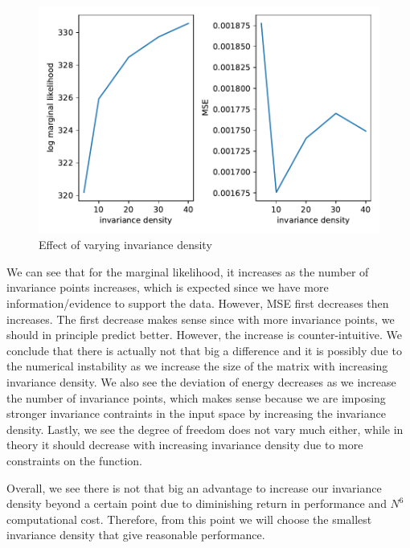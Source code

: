 \documentclass{statsmsc}
\begin{document}
\begin{figure}[H] 
  \includegraphics[width=0.8\linewidth]{../codes/figures/vary_invariance.pdf}
  \centering
  \caption{Effect of varying invariance density}
  \label{fig:vary_invariance_density}
\end{figure}

We can see that for the marginal likelihood, it increases as the number of invariance points increases, which is expected since we have more information/evidence to support the data.
However, MSE first decreases then increases.
The first decrease makes sense since with more invariance points, we should in principle predict better.
However, the increase is counter-intuitive.
We conclude that there is actually not that big a difference and it is possibly due to the numerical instability as we increase the size of the matrix with increasing invariance density.  
We also see the deviation of energy decreases as we increase the number of invariance points, which makes sense because we are imposing stronger invariance contraints in the input space by increasing the invariance density.
Lastly, we see the degree of freedom does not vary much either, while in theory it should decrease with increasing invariance density due to more constraints on the function.

Overall, we see there is not that big an advantage to increase our invariance density beyond a certain point due to diminishing return in performance and $N^6$ computational cost.
Therefore, from this point we will choose the smallest invariance density that give reasonable performance.  
\end{document}
